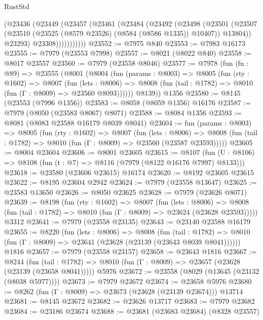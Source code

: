 \begin{lexlean}{RustStd}
\begin{coremodule}
              (@23436
                (@23449
                  (@23457
                    (@23461
                      (@23484
                        (@23492
                          (@23498
                            (@23501
                              (@23507
                                (@23510 (@23525 (@8579 @23526) (@8584 (@8586 @1335)) @10407))
                                @13804))
                            @23293)
                          @23308)))))))))))
@23552 := @7975 @840
@23553 := @7983 @16173
@23555 := @7979 (@23553 @7998)
@23557 := @8021 (@8022 @840)
@23558 := @8017 @23557
@23560 := @7979 (@23558 @8046)
@23577 := @7978
    (fun (fn : @89) =>
    @23555
      (@8001
        (@8004
          (fun (params : @8003) =>
          @8005
            (fun (rty : @1602) =>
            @8007
              (fun (lets : @8006) =>
              @8008 (fun (tail : @1782) => @8010 (fun (Γ : @8009) => @23560 @8093))))))
        @8139))
    @1356
@23580 := @8145 (@23553 (@7996 @1356))
@23583 := @8058 (@8059 @1356) @16176
@23587 := @7979 (@8050 (@23583 @8067) @8071)
@23588 := @8084 @1356
@23593 := @8081 (@8083 @23588 @16179 @8039 @8041)
@23604 := fun (params : @8003) =>
  @8005
    (fun (rty : @1602) =>
    @8007
      (fun (lets : @8006) =>
      @8008 (fun (tail : @1782) => @8010 (fun (Γ : @8009) => @23560 (@23587 @23593)))))
@23605 := @8004 @23604
@23606 := @8001 @23605
@23615 := @8107
    (fun (U : @8106) => @8108 (fun (t : @7) => @8116 (@7979 (@8122 @16176 @7997) @8133)))
@23618 := @23580 (@23606 @23615) @16174
@23620 := @8192 @23605 @23615
@23622 := @8195 @23604 @2942
@23624 := @7979 (@23558 @13647)
@23625 := @23583 @13650
@23626 := @8050 @23625
@23628 := @7979 (@23626 @8071)
@23639 := @8198
    (fun (rty : @1602) =>
    @8007
      (fun (lets : @8006) =>
      @8008 (fun (tail : @1782) => @8010 (fun (Γ : @8009) => @23624 (@23628 @23593)))))
    @3312
@23641 := @7979 (@23558 @23135)
@23643 := @23140 @23588 @16179
@23655 := @8220
    (fun (lets : @8006) =>
    @8008
      (fun (tail : @1782) =>
      @8010 (fun (Γ : @8009) => @23641 (@23628 (@23139 (@23643 @8039 @8041))))))
    @1816
@23657 := @7979 (@23558 @23157)
@23658 := @23643 @1816
@23667 := @8244
    (fun (tail : @1782) => @8010 (fun (Γ : @8009) => @23657 (@23628 (@23139 (@23658 @8041)))))
    @5976
@23672 := @23558 (@8029 (@13645 (@23132 (@8038 @5977))))
@23673 := @7979 @23672
@23674 := @23658 @5976
@23680 := @8262 (fun (Γ : @8009) => @23673 (@23628 (@23139 @23674))) @13714
@23681 := @8145 @23672
@23682 := @23626 @13717
@23683 := @7979 @23682
@23684 := @23186 @23674
@23688 := @23681 (@23683 @23684) (@8328 @23557)

\end{coremodule}
\end{lexlean}
